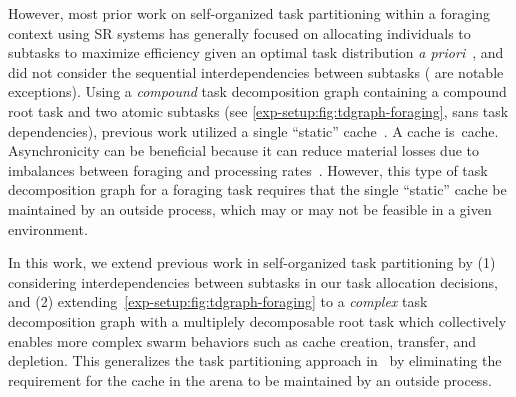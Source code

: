 However, most prior work on self-organized task partitioning within a foraging
context using SR systems has generally focused on allocating individuals to
subtasks to maximize efficiency given an optimal task distribution \emph{a
  priori}~\cite{Correll2008,Berman2009,Matthey2009,Hsieh2008}, and did not
consider the sequential interdependencies between subtasks
(\cite{Pini2011b,Brutschy2014,Ferrante2015,Frison2010,Harwell2018} are notable
exceptions). Using a \emph{compound} task decomposition graph containing a
compound root task and two atomic subtasks (see
\cref{exp-setup:fig:tdgraph-foraging}, sans task dependencies), previous work
utilized a single ``static''
cache~\cite{Pini2011b,Pini2013a,Brutschy2014,Ferrante2015,Frison2010,Harwell2018}.
A \gls{cache} is~\glsdesc{cache}. Asynchronicity can be beneficial because it
can reduce material losses due to imbalances between foraging and processing
rates~\cite{Hart2000}. However, this type of task decomposition graph for a
foraging task requires that the single ``static'' cache be maintained by an
outside process, which may or may not be feasible in a given environment.

In this work, we extend previous work in self-organized task partitioning by (1)
considering interdependencies between subtasks in our task allocation decisions,
and (2) extending~\cref{exp-setup:fig:tdgraph-foraging} to a \emph{complex} task
decomposition graph with a multiplely decomposable root task which collectively
enables more complex swarm behaviors such as cache creation, transfer, and
depletion. This generalizes the task partitioning approach in~\cite{Harwell2018}
by eliminating the requirement for the cache in the arena to be maintained by an
outside process.

